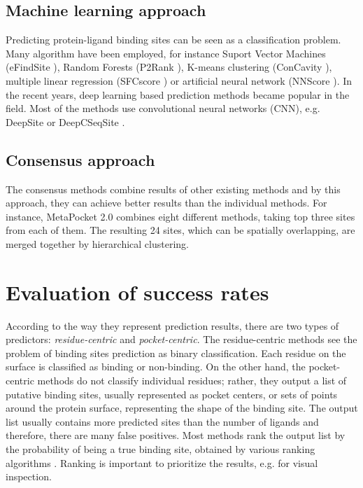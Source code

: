 \subsection{Machine learning approach}
Predicting protein-ligand binding sites can be seen as a classification problem. Many algorithm have been employed, for instance Suport Vector Machines (eFindSite \cite{efindsite}), Random Forests (P2Rank \cite{p2rank1}), K-means clustering (ConCavity \cite{concavity}), multiple linear regression (SFCscore \cite{sfcscore}) or artificial neural network (NNScore \cite{nnscore}). In the recent years, deep learning based prediction methods became popular in the field. Most of the methods use convolutional neural networks (CNN), e.g. DeepSite \cite{deepsite} or DeepCSeqSite \cite{deepcseqsite}.

\subsection{Consensus approach}
The consensus methods combine results of other existing methods and by this approach, they can achieve better results than the individual methods. For instance, MetaPocket 2.0 \cite{metapocket} combines eight different methods, taking top three sites from each of them. The resulting 24 sites, which can be spatially overlapping, are merged together by hierarchical clustering.


\section{Evaluation of success rates} \label{s:metrics}

According to the way they represent prediction results, there are two types of predictors: \textit{residue-centric} and \textit{pocket-centric}. The residue-centric methods see the problem of binding sites prediction as binary classification. Each residue on the surface is classified as binding or non-binding. On the other hand, the pocket-centric methods do not classify individual residues; rather, they output a list of putative binding sites, usually represented as pocket centers, or sets of points around the protein surface, representing the shape of the binding site. The output list usually contains more predicted sites than the number of ligands and therefore, there are many false positives. Most methods rank the output list by the probability of being a true binding site, obtained by various ranking algorithms \cite{p2rank1}. Ranking is important to prioritize the results, e.g. for visual inspection.

